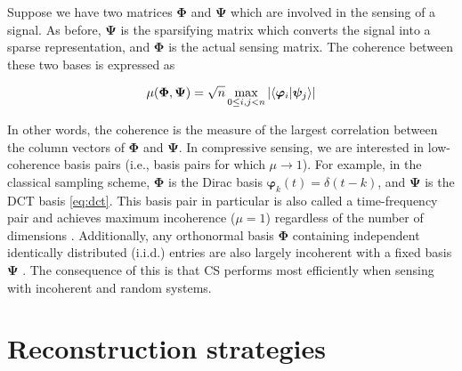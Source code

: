 Suppose we have two matrices $\bm\Phi$ and $\bm\Psi$ which are involved in the sensing of a signal. As before, $\bm\Psi$ is the sparsifying matrix which converts the signal into a sparse representation, and $\bm\Phi$ is the actual sensing matrix. The coherence between these two bases is expressed as

\begin{equation}\label{eq:coherence}
	\mu\qty(\bm\Phi, \bm\Psi) = \sqrt{n} \max_{0 \leq i,j < n} \abs{\innerproduct{\bm\varphi_i}{\bm\psi_j}}
\end{equation}

\noindent In other words, the coherence is the measure of the largest correlation between the column vectors of $\bm\Phi$ and $\bm\Psi$. In compressive sensing, we are interested in low-coherence basis pairs (i.e., basis pairs for which $\mu \rightarrow 1$). For example, in the classical sampling scheme, $\bm\Phi$ is the Dirac basis $\bm\varphi_k(t) = \delta(t - k)$, and $\bm\Psi$ is the DCT basis \eqref{eq:dct}. This basis pair in particular is also called a time-frequency pair and achieves maximum incoherence ($\mu = 1$) regardless of the number of dimensions \cite{Donoho2001}. Additionally, any orthonormal basis $\bm\Phi$ containing independent identically distributed (i.i.d.) entries are also largely incoherent with a fixed basis $\bm\Psi$ \cite{Candes2008b}. The consequence of this is that CS performs most efficiently when sensing with incoherent and random systems.


\section{Reconstruction strategies}
\label{sec:reconstruct}